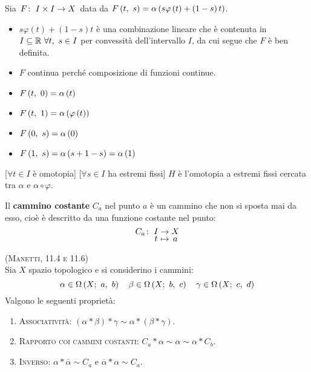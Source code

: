 \begin{demonstration}
	Sia $\funz{F}{I\times I}{X}$ data da $F\left(t,\ s\right)=\alpha\left(s\varphi\left(t\right)+\left(1-s\right)t\right)$.
	\begin{itemize}
		\item $s\varphi\left(t\right)+\left(1-s\right)t$ è una combinazione lineare che è contenuta in $I\subseteq \mathbb{R}\ \forall t,\ s\in I$ per convessità dell'intervallo $I$, da cui segue che $F$ è ben definita.
		\item $F$ continua perché composizione di funzioni continue.
		\item \parbox[t]{0.38\textwidth}{$F\left(t,\ 0\right)=\alpha\left(t\right)$}
		\item \parbox[t]{0.38\textwidth}{$F\left(t,\ 1\right)=\alpha\left(\varphi\left(t\right)\right)$}
		\item \parbox[t]{0.38\textwidth}{$F\left(0,\ s\right)=\alpha\left(0\right)$}
		\item \parbox[t]{0.38\textwidth}{$F\left(1,\ s\right)=\alpha\left(s+1-s\right)=\alpha\left(1\right)$}
	\end{itemize}
[$\forall t\in I$ è omotopia]
[$\forall s\in I$ ha estremi fissi]
$H$ è l'omotopia a estremi fissi cercata tra $\alpha$ e $\alpha\circ\varphi$.
\end{demonstration}
\begin{define}
	Il \textbf{cammino costante} $C_a$ nel punto $a$ è un cammino che non si sposta mai da esso, cioè è descritto da una funzione costante nel punto:
	\begin{equation}
		\funztot{C_a}{I}{X}{t}{a}
	\end{equation}
\end{define}
\begin{proposition}\textsc{(Manetti, 11.4 e 11.6)\label{propcammini}}\\
	Sia $X$ spazio topologico e si considerino i cammini:
	\begin{equation*}
	\alpha\in\Omega\left(X;\ a,\ b\right)\quad\beta\in\Omega\left(X;\ b,\ c\right)\quad\gamma\in\Omega\left(X;\ c,\ d\right)
	\end{equation*}
Valgono le seguenti proprietà:
\begin{enumerate}
	\item \textsc{Associatività}: $\left(\alpha\ast\beta\right)\ast \gamma \sim \alpha\ast\left(\beta\ast\gamma\right)$.
	\item \textsc{Rapporto coi cammini costanti}: $C_a\ast \alpha \sim \alpha \sim \alpha \ast C_b$. 
	\item \textsc{Inverso}: $\alpha\ast\overline{\alpha}\sim C_a$ e $\overline{\alpha}\ast\alpha\sim C_a$.
\end{enumerate}
\end{proposition}
